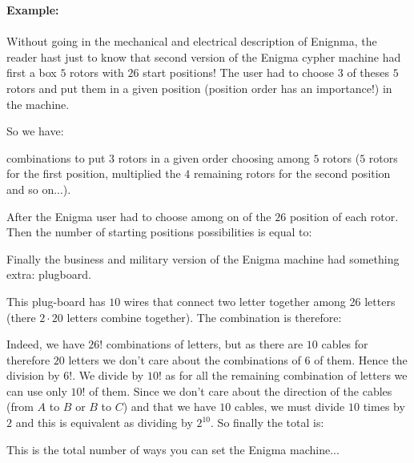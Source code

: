 	\begin{tcolorbox}[colframe=black,colback=white,sharp corners]
	\textbf{{\Large {}}Example:}\\\\
	Without going in the mechanical and electrical description of Enignma, the reader hast just to know that second version of the Enigma\label{enigma} cypher machine had first a box $5$ rotors with $26$ start positions! The user had to choose $3$ of theses $5$ rotors and put them in a given position (position order has an importance!) in the machine.

	So we have:
	
	combinations to put $3$ rotors in a given order choosing among $5$ rotors ($5$ rotors for the first  position, multiplied the $4$ remaining rotors for the second position and so on...).
	
	After the Enigma user had to choose among on of the $26$ position of each rotor. Then the number of starting positions possibilities is equal to:
	
	Finally the business and military version of the Enigma machine had something extra: plugboard.
	
	This plug-board has $10$ wires that connect two letter together among 26 letters (there $2\cdot 20$ letters combine together). The combination is therefore:
	
	Indeed, we have $26!$ combinations of letters, but as there are $10$ cables for therefore $20$ letters we don't care about the combinations of $6$ of them. Hence the division by $6!$. We divide by $10!$ as for all the remaining combination of letters we can use only $10!$ of them. Since we don't care about the direction of the cables (from $A$ to $B$ or $B$ to $C$) and that we have $10$ cables, we must divide $10$ times by $2$ and this is equivalent as dividing by $2^{10}$.
	So finally the total is:
	
	This is the total number of ways you can set the Enigma machine...
	\end{tcolorbox}
		
